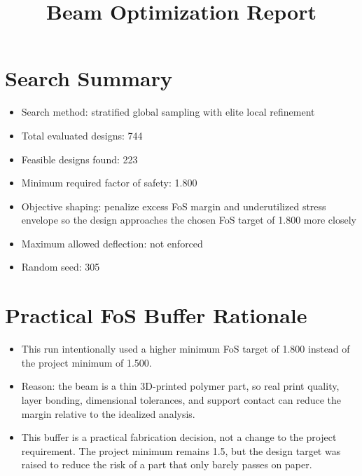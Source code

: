 \documentclass[11pt]{article}
\title{Beam Optimization Report}
\date{}
\begin{document}
\maketitle

\section*{Search Summary}
\begin{itemize}
\item Search method: stratified global sampling with elite local refinement
\item Total evaluated designs: 744
\item Feasible designs found: 223
\item Minimum required factor of safety: 1.800
\item Objective shaping: penalize excess FoS margin and underutilized stress envelope so the design approaches the chosen FoS target of 1.800 more closely
\item Maximum allowed deflection: not enforced
\item Random seed: 305
\end{itemize}


\section*{Practical FoS Buffer Rationale}
\begin{itemize}
\item This run intentionally used a higher minimum FoS target of 1.800 instead of the project minimum of 1.500.
\item Reason: the beam is a thin 3D-printed polymer part, so real print quality, layer bonding, dimensional tolerances, and support contact can reduce the margin relative to the idealized analysis.
\item This buffer is a practical fabrication decision, not a change to the project requirement. The project minimum remains 1.5, but the design target was raised to reduce the risk of a part that only barely passes on paper.
\end{itemize}
\end{document}
